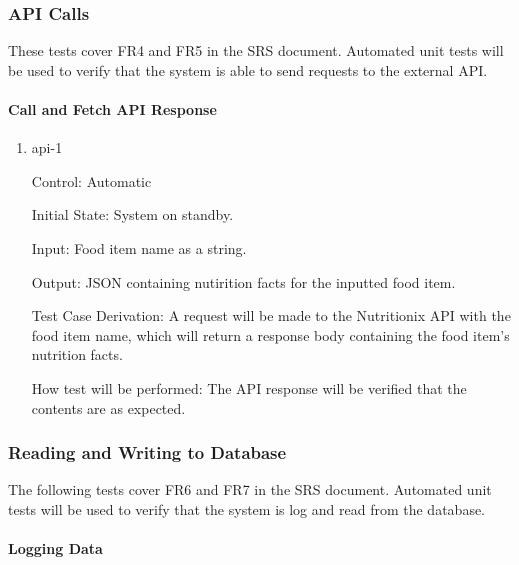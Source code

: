 \documentclass[12pt, titlepage]{article}
\begin{document}
	\subsubsection{API Calls}
	
	These tests cover  FR4 and FR5 in the SRS document. Automated unit tests will be used to verify that the system is able to send requests to the external API.
	
	\paragraph{Call and Fetch API Response}
	
	\begin{enumerate}
		
		\item{api-1\\}
		
		Control: Automatic
		
		Initial State: System on standby.
		
		Input: Food item name as a string.
		
		Output: JSON containing nutirition facts for the inputted food item.
		
		Test Case Derivation: A request will be made to the Nutritionix API with the food item name, which will return a response body containing the food item's nutrition facts.
		
		How test will be performed: The API response will be verified that the contents are as expected.
		
	\end{enumerate}
	
	\subsubsection{Reading and Writing to Database}
	
	The following tests cover  FR6 and FR7 in the SRS document. Automated unit tests will be used to verify that the system is log and read from the database.
	
	\paragraph{Logging Data}
	
\end{document}
